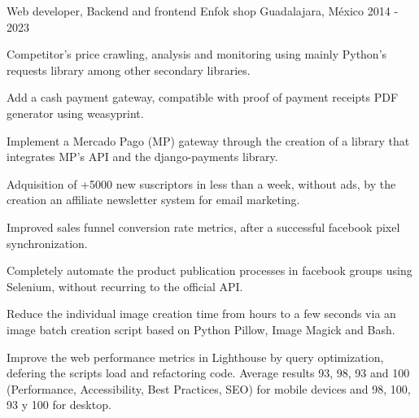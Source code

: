 

\begin{cventries}

  \cventry
    {Web developer, Backend and frontend}
    {Enfok shop}
    {Guadalajara, México}
    {2014 - 2023}
    {
      \begin{cvitems}
        \item {Competitor's price crawling, analysis and monitoring using mainly Python's requests library among other secondary libraries.}
        \item {Add a cash payment gateway, compatible with proof of payment receipts PDF generator using weasyprint.}
        \item {Implement a Mercado Pago (MP) gateway through the creation of a library that integrates MP's API and the django-payments library.}
        \item {Adquisition of +5000 new suscriptors in less than a week, without ads, by the creation an affiliate newsletter system for email marketing.}
        \item {Improved sales funnel conversion rate metrics, after a successful facebook pixel synchronization.}
        \item {Completely automate the product publication processes in facebook groups using Selenium, without recurring to the official API.}
        \item {Reduce the individual image creation time from hours to a few seconds via an image batch creation script based on Python Pillow, Image Magick and Bash.}
        \item {Improve the web performance metrics in Lighthouse by query optimization, defering the scripts load and refactoring code. Average results 93, 98, 93 and 100 (Performance, Accessibility, Best Practices, SEO) for mobile devices and 98, 100, 93 y 100 for desktop.}
      \end{cvitems}
    }


\end{cventries}
